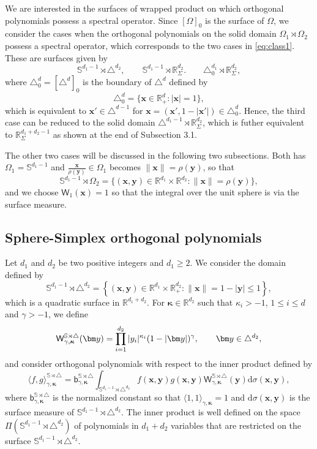 \documentclass{amsart}
\theoremstyle{remark}
\def\la{{\langle}}
\def\ra{{\rangle}}
\def\d{\mathrm{d}}
\def\sb{{\mathsf b}}
\def\sW{{\mathsf W}}
\def\g{{\gamma}}
\def\k{{\kappa}}
\def\s{\sigma}
\def\la{{\langle}}
\def\ra{{\rangle}}
\def\xb{{\bm x}}
\def\yb{{\bm y}}
\def\RR{{\mathbb R}}
\def\SS{{\mathbb S}}
\def\bk{{\boldsymbol{\kappa}}}
\begin{document}
We are interested in the surfaces of wrapped product on which orthogonal polynomials possess a
spectral operator. Since $[\Omega]_0$ is the surface of $\Omega$, we consider the cases when
the orthogonal polynomials on the solid domain $\Omega_1\rtimes \Omega_2$ possess a spectral
operator, which corresponds to the two cases in \eqref{eq:class1}. These are surfaces given by
$$
\SS^{d_1-1}\!\! \rtimes \triangle^{d_2}, \qquad \SS^{d_1-1}\!\! \rtimes \RR_\Sigma^{d_2}. 
   \qquad   \triangle_0^{d_1} \rtimes \RR_\Sigma^{d_2},
$$
where $\triangle_0^{d} = [\triangle^d]_0$ is the boundary of $\triangle^d$ defined by 
$$
   \triangle_0^{d} = \{\xb \in \RR_+^d: |\xb| = 1\},
$$
which is equivalent to $\xb'\in \triangle^{d-1}$ for $\xb = (\xb', 1-|\xb'|) \in \triangle_0^d$. Hence, the third case
can be reduced to the solid domain $\triangle^{d_1-1} \rtimes \RR_\Sigma^{d_2}$, which is futher equivalent to 
$\RR_\Sigma^{d_1+d_2-1}$ as shown at the end of Subsection 3.1. 

The other two cases will be discussed in the following two subsections. Both has $\Omega_1= \SS^{d_1-1}$
and $ \frac{\xb}{\rho(\yb)} \in \Omega_1$ becomes $\|\xb\| = \rho(\yb)$, so that
$$
\SS^{d_1-1} \rtimes \Omega_2 =\{(\xb,\yb) \in \RR^{d_1}\times \RR^{d_2}:  \|\xb\| = \rho(\yb)\},
$$
and we choose $\sW_1(\xb)  = 1$ so that the integral over the unit sphere is via the surface measure. 


\subsection{Sphere-Simplex orthogonal polynomials}
Let $d_1$ and $d_2$ be two positive integers and $d_1 \ge 2$. We consider the domain 
defined by
$$
\SS^{d_1-1} \!\rtimes \triangle^{d_2} = \left\{(\bm x,\bm y) \in \RR^{d_1} \times \RR_+^{d_2}: \|\bm x\| = 1- |\bm y| \le 1\right\},
$$
which is a quadratic surface in $\RR^{d_1+d_2}$. For $\bm\kappa \in \RR^{d_2}$ such that $\k_i > -1$, $1 \le i \le d$
and $\g > -1$, we define  
$$
  {\sf W}_{\g,\bk}^{\SS \rtimes \triangle}(\bm y) =  \prod_{i=1}^{d_2} |y_i|^{\k_i} (1-|\bm y|)^{\g}, \qquad \yb \in \triangle^{d_2},
$$
and consider orthogonal polynomials with respect to the inner product defined by 
\begin{equation} \label{eq:ipd_ST0}
  \la f, g\ra_{\g, \bk}^{\SS \rtimes \triangle} = \sb_{\g,\bk}^{\SS \rtimes \triangle} 
   \int_{\SS^{d_1-1} \!\rtimes \triangle^{d_2}} f(\bm x,\bm y) g(\bm x,\bm y) 
       \sW_{\g,\bk}^{\SS \rtimes \triangle}(\bm y) \d \s(\bm x, \bm y), 
\end{equation}
where $\sb_{\g,\bk}^{\SS \rtimes \triangle} $ is the normalized constant so that 
$ \la 1, 1\ra_{\g, \bk} =1$ and $\d \s(\bm x, \bm y)$ is the
surface measure of $\SS^{d_1-1} \!\rtimes \triangle^{d_2}$. The inner product is well defined on the space 
$\Pi(\SS^{d_1-1} \!\rtimes \triangle^{d_2})$ of polynomials in $d_1+d_2$ variables that are restricted on the surface 
$\SS^{d_1-1} \!\rtimes \triangle^{d_2}$.
\end{document}
